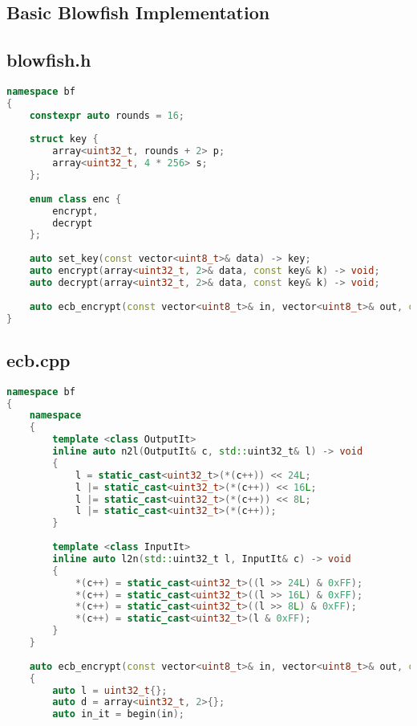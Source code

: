 \begin{appendix}

\section{Basic Blowfish Implementation}\label{app:blowfish}

\subsection{blowfish.h}

\begin{lstlisting}[language=C++]
namespace bf
{
    constexpr auto rounds = 16;
    
    struct key {
        array<uint32_t, rounds + 2> p;
        array<uint32_t, 4 * 256> s;
    };
    
    enum class enc {
        encrypt,
        decrypt
    };
    
    auto set_key(const vector<uint8_t>& data) -> key;
    auto encrypt(array<uint32_t, 2>& data, const key& k) -> void;
    auto decrypt(array<uint32_t, 2>& data, const key& k) -> void;
    
    auto ecb_encrypt(const vector<uint8_t>& in, vector<uint8_t>& out, const key& k, enc e) -> void;
}
\end{lstlisting}

\subsection{ecb.cpp}

\begin{lstlisting}[language=C++]
namespace bf
{
    namespace
    {
        template <class OutputIt>
        inline auto n2l(OutputIt& c, std::uint32_t& l) -> void
        {
            l = static_cast<uint32_t>(*(c++)) << 24L;
            l |= static_cast<uint32_t>(*(c++)) << 16L;
            l |= static_cast<uint32_t>(*(c++)) << 8L;
            l |= static_cast<uint32_t>(*(c++));
        }
        
        template <class InputIt>
        inline auto l2n(std::uint32_t l, InputIt& c) -> void
        {
            *(c++) = static_cast<uint32_t>((l >> 24L) & 0xFF);
            *(c++) = static_cast<uint32_t>((l >> 16L) & 0xFF);
            *(c++) = static_cast<uint32_t>((l >> 8L) & 0xFF);
            *(c++) = static_cast<uint32_t>(l & 0xFF);
        }
    }
    
    auto ecb_encrypt(const vector<uint8_t>& in, vector<uint8_t>& out, const key& k, enc e) -> void
    {
        auto l = uint32_t{};
        auto d = array<uint32_t, 2>{};
        auto in_it = begin(in);


\end{lstlisting}
\end{appendix}
